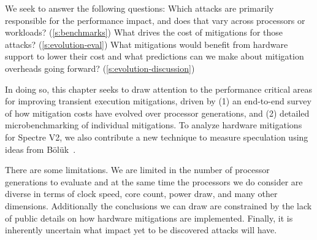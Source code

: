We seek to answer the following questions: 
Which attacks are primarily responsible for the performance impact, and does that vary across processors or workloads? (\autoref{s:benchmarks})
What drives the cost of mitigations for those attacks? (\autoref{s:evolution-eval})
What mitigations would benefit from hardware support to lower their cost and what predictions can we make about mitigation overheads going forward? (\autoref{s:evolution-discussion})




In doing so, this chapter seeks to draw attention to the performance critical areas for improving transient execution mitigations, driven by (1) an end-to-end survey of how mitigation costs have evolved over processor generations, and (2) detailed microbenchmarking of individual mitigations.
To analyze hardware mitigations for Spectre V2, we also contribute a new technique to measure speculation using ideas from Bölük~\cite{speculating-x86}.

There are some limitations.
We are limited in the number of processor generations to evaluate and at the same time the processors we do consider are diverse in terms of clock speed, core count, power draw, and many other dimensions.
Additionally the conclusions we can draw are constrained by the lack of public details on how hardware mitigations are implemented.  
Finally, it is inherently uncertain what impact yet to be discovered attacks will have.

